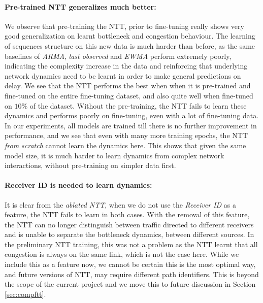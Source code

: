 \paragraph*{Pre-trained NTT generalizes much better:} We observe that pre-training the NTT, prior to fine-tuning really shows very good generalization on learnt bottleneck and congestion behaviour. The learning of sequences structure on this new data is much harder than before, as the same baselines of \emph{ARMA}, \emph{last observed} and \emph{EWMA} perform extremely poorly, indicating the complexity increase in the data and reinforcing that underlying network dynamics need to be learnt in order to make general predictions on delay. We see that the NTT performs the best when when it is pre-trained and fine-tuned on the entire fine-tuning dataset, and also quite well when fine-tuned on $10\%$ of the dataset. Without the pre-training, the NTT fails to learn these dynamics and performs poorly on fine-tuning, even with a lot of fine-tuning data. In our experiments, all models are trained till there is no further improvement in performance, and we see that even with many more training epochs, the NTT \emph{from scratch} cannot learn the dynamics here. This shows that given the same model size, it is much harder to learn dynamics from complex network interactions, without pre-training on simpler data first.

\paragraph*{Receiver ID is needed to learn dynamics:} It is clear from the \emph{ablated NTT}, when we do not use the \emph{Receiver ID} as a feature, the NTT fails to learn in both cases. With the removal of this feature, the NTT can no longer distinguish between traffic directed to different receivers and is unable to separate the bottleneck dynamics, between different sources. In the preliminary NTT training, this was not a problem as the NTT learnt that all congestion is always on the same link, which is not the case here. While we include this as a feature now, we cannot be certain this is the most optimal way, and future versions of NTT, may require different path identifiers. This is beyond the scope of the current project and we move this to future discussion in Section \ref{sec:compftt}.


